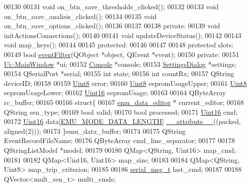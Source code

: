 \begin{DoxyCode}
00130 
00131     \textcolor{keywordtype}{void} on\_btn\_save\_thresholds\_clicked();
00132 
00133     \textcolor{keywordtype}{void} on\_btn\_save\_analisis\_clicked();
00134 
00135     \textcolor{keywordtype}{void} on\_btn\_save\_options\_clicked();
00136 
00137 
00138 \textcolor{keyword}{private}:
00139     \textcolor{keywordtype}{void} initActionsConnections();
00140 
00141     \textcolor{keywordtype}{void} updateDeviceStatus();
00142 
00143     \textcolor{keywordtype}{void} map\_keys();
00144 
00145 \textcolor{keyword}{protected}:
00146 
00147 
00148 \textcolor{keyword}{protected} slots:
00149     \textcolor{keywordtype}{bool} \hyperlink{a00006_a91df90bb5045775882c062cefdf903e9}{eventFilter}(QObject *\textcolor{keywordtype}{object}, QEvent *event);
00150 \textcolor{keyword}{private}:
00151     \hyperlink{a00007}{Ui::MainWindow} *ui;
00152     \hyperlink{a00002}{Console} *console;
00153     \hyperlink{a00022}{SettingsDialog} *settings;
00154     QSerialPort *serial;
00155     \textcolor{keywordtype}{int} state;
00156     \textcolor{keywordtype}{int} countRx;
00157     QString deviceID;
00158 
00159     \hyperlink{a00001_a979e3e23b9a449e69ab6a8a83b6042f8}{Uint8}  error;
00160     \hyperlink{a00001_a979e3e23b9a449e69ab6a8a83b6042f8}{Uint8}  eepromUsageUpper;
00161     \hyperlink{a00001_a979e3e23b9a449e69ab6a8a83b6042f8}{Uint8}  eepromUsageLower;
00162     \hyperlink{a00001_aae7407b021d43f7193a81a58cfb3e297}{Uint16} eepromUsage;
00163 
00164     QByteArray          rc\_buffer;
00165 
00166     \textcolor{keyword}{struct}\{
00167     \hyperlink{a00004}{emu\_data\_editor} *   current\_editor;
00168     QString             sen\_type;
00169     \textcolor{keywordtype}{bool}                valid;
00170     \textcolor{keywordtype}{bool}                processed;
00171     \hyperlink{a00001_aae7407b021d43f7193a81a58cfb3e297}{Uint16}              cmd;
00172     \hyperlink{a00001_aae7407b021d43f7193a81a58cfb3e297}{Uint16}              data[\hyperlink{a00003_af4c3a8ad94feb4d7bda7f107f34baf41}{EMU\_MODE\_DATA\_LENGTH}] 
      \hyperlink{a00003_ad8187eb7fe09751a387e3dcb11c51565}{\_\_attribute\_\_}((packed, aligned(2)));
00173     \}emu\_data\_buffer;
00174 
00175     QString EventRecordFileName;
00176     QByteArray cmd\_line\_separator;
00177 
00178     QStringListModel *model;
00179 
00180     QMap<QString, Uint16> map\_cmd;
00181 
00182     QMap<Uint16, Uint16> map\_size;
00183 
00184     QMap<QString, Uint8> map\_trip\_criterion;
00185     
00186     \hyperlink{a00001_df/dc8/a00122}{serial\_msg\_t}     last\_cmd;
00187 
00188     QVector<mult\_sen\_t> multi\_cmds;

\end{DoxyCode}
